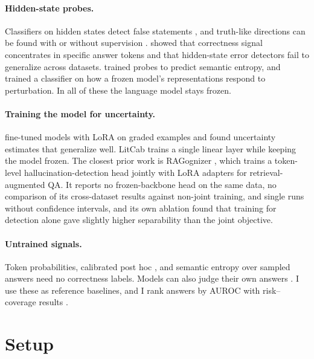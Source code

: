 \documentclass[11pt]{article}
\begin{document}
\paragraph{Hidden-state probes.} Classifiers on hidden states detect false statements \citep{azaria-mitchell-2023-internal}, and truth-like directions can be found with or without supervision \citep{burns2023discovering,marks2024geometry}. \citet{orgad2025llms} showed that correctness signal concentrates in specific answer tokens and that hidden-state error detectors fail to generalize across datasets. \citet{kossen2024semantic} trained probes to predict semantic entropy, and \citet{khanmohammadi2025calibrating} trained a classifier on how a frozen model's representations respond to perturbation. In all of these the language model stays frozen.

\paragraph{Training the model for uncertainty.} \citet{kapoor2024large} fine-tuned models with LoRA on graded examples and found uncertainty estimates that generalize well. LitCab \citep{liu2024litcab} trains a single linear layer while keeping the model frozen. The closest prior work is RAGognizer \citep{ridder2026ragognizer}, which trains a token-level hallucination-detection head jointly with LoRA adapters for retrieval-augmented QA. It reports no frozen-backbone head on the same data, no comparison of its cross-dataset results against non-joint training, and single runs without confidence intervals, and its own ablation found that training for detection alone gave slightly higher separability than the joint objective.

\paragraph{Untrained signals.} Token probabilities, calibrated post hoc \citep{platt1999probabilistic,guo2017calibration}, and semantic entropy over sampled answers \citep{kuhn2023semantic,farquhar2024detecting} need no correctness labels. Models can also judge their own answers \citep[P(True);][]{kadavath2022language}. I use these as reference baselines, and I rank answers by AUROC with risk--coverage results \citep{geifman2017selective}.

\section{Setup}
\end{document}
